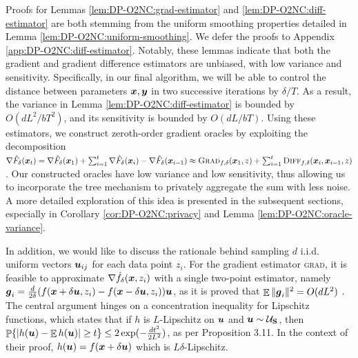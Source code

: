 Proofs for Lemmas \ref{lem:DP-O2NC:grad-estimator} and \ref{lem:DP-O2NC:diff-estimator} are both stemming from the uniform smoothing properties detailed in Lemma \ref{lem:DP-O2NC:uniform-smoothing}. We defer the proofs to Appendix \ref{app:DP-O2NC:diff-estimator}.
Notably, these lemmas indicate that both the gradient and gradient difference estimators are unbiased, with low variance and sensitivity. Specifically, in our final algorithm, we will be able to control the distance between parameters ${\boldsymbol{x}},{\boldsymbol{y}}$ in two successive iterations by $\delta/T$. As a result, the variance in Lemma \ref{lem:DP-O2NC:diff-estimator} is bounded by $O({dL^2}/{bT^2})$, and its sensitivity is bounded by $O({dL}/{bT})$. Using these estimators, we construct zeroth-order gradient oracles  by exploiting the decomposition $\nabla \hat F_\delta({\boldsymbol{x}}_t) = \nabla \hat F_\delta({\boldsymbol{x}}_1) + \sum_{i=1}^t \nabla \hat F_\delta({\boldsymbol{x}}_i)-\nabla \hat F_\delta({\boldsymbol{x}}_{i-1})\approx {\normalfont\textsc{Grad}}_{f,\delta}({\boldsymbol{x}}_1,z) +\sum_{i=1}^t {\normalfont\textsc{Diff}}_{f,\delta}({\boldsymbol{x}}_i,{\boldsymbol{x}}_{i-1},z)$. Our constructed oracles have low variance and low sensitivity, thus allowing us to incorporate the tree mechanism to privately aggregate the sum with less noise.
A more detailed exploration of this idea is presented in the subsequent sections, especially in Corollary \ref{cor:DP-O2NC:privacy} and Lemma \ref{lem:DP-O2NC:oracle-variance}.

In addition, we would like to discuss the rationale behind sampling $d$ i.i.d. uniform vectors ${\boldsymbol{u}}_{ij}$ for each data point $z_i$. For the gradient estimator \textsc{grad}, it is feasible to approximate $\nabla\hat f_\delta({\boldsymbol{x}},z_i)$ with a single two-point estimator, namely ${\boldsymbol{g}}_i=\frac{d}{2\delta}(f({\boldsymbol{x}}+\delta{\boldsymbol{u}},z_i)-f({\boldsymbol{x}}-\delta{\boldsymbol{u}},z_i)){\boldsymbol{u}}$, as it is proved that $\mathop{\mathbb{E}}\|{\boldsymbol{g}}_i\|^2 = O(dL^2)$ \citep[Lemma 10]{shamir2017optimal}. The central argument hinges on a concentration inequality for Lipschitz functions, which states that if $h$ is $L$-Lipschitz on ${\boldsymbol{u}}$ and ${\boldsymbol{u}}\sim{\cal U}_{\mathbf{S}}$, then $\mathop{\mathbb{P}}\{|h({\boldsymbol{u}})-\mathop{\mathbb{E}} h({\boldsymbol{u}})| \ge t\} \le 2\exp(-\frac{dt^2}{2L^2})$, as per \citep{wainwright2019high} Proposition 3.11. In the context of their proof, $h({\boldsymbol{u}}) = f({\boldsymbol{x}}+\delta{\boldsymbol{u}})$ which is $L\delta$-Lipschitz.

